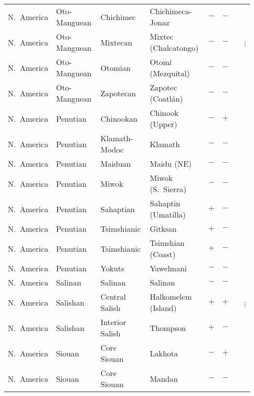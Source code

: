 \begin{landscape}
\begin{longtable}{l>{\raggedright\arraybackslash}p{2.2cm}>{\raggedright}p{2.5cm}>{\raggedright\arraybackslash}p{2.5cm}cc>{\raggedright\arraybackslash}p{3.4cm}>{\raggedright\arraybackslash}p{3.4cm}}
N.~America & Oto-Manguean & Chichimec & Chichimeca-Jonaz & $-$ & $-$ & \citealt{Gil2013} & \citealt[23--30]{Suarez1984}\\
N.~America & Oto-Manguean & Mixtecan & Mixtec (Chalcatongo) & $-$ & $-$ & \citealt{Gil2013} & \citealt{Corbett2013}; \citealt[81--85]{Macaulay1996}\\
N.~America & Oto-Manguean & Otomian & Otomí (Mezquital) & $-$ & $-$ & \citealt[passim]{Hess1968} & \citealt[passim]{Hess1968}\\
N.~America & Oto-Manguean & Zapotecan & Zapotec (Coatlán) & $-$ & $-$ & \citealt[passim]{BeamdeAzcona2004} & \citealt[passim]{BeamdeAzcona2004}\\
N.~America & Penutian & Chinookan & Chinook (Upper) & $-$ & $+$ & \citealt{Gil2013} & \citealt[72--75, 214]{Hymes1955}\\
N.~America & Penutian & Klamath-Modoc & Klamath & $-$ & $-$ & \citealt{Gil2013} & \citealt[448--451]{Mithun2001}\\
N.~America & Penutian & Maiduan & Maidu (NE) & $-$ & $-$ & \citealt{Gil2013} & \citealt[299]{Nichols1992}\\
N.~America & Penutian & Miwok & Miwok (S.~Sierra) & $-$ & $-$ & \citealt{Gil2013} & \citealt{Corbett2013}\\
N.~America & Penutian & Sahaptian & Sahaptin (Umatilla) & $+$ & $-$ & \citealt[299]{Nichols1992} & \citealt[299]{Nichols1992}\\
N.~America & Penutian & Tsimshianic & Gitksan & $+$ & $-$ & \citealt[299]{Nichols1992} & \citealt[passim]{Hunt1993}\\
N.~America & Penutian & Tsimshianic & Tsimshian (Coast) & $+$ & $-$ & \citealt{Gil2013} & \citealt{Corbett2013}\\
N.~America & Penutian & Yokuts & Yawelmani & $-$ & $-$ & \citealt{Gil2013} & \citealt[299]{Nichols1992}\\
N.~America & Salinan & Salinan & Salinan & $-$ & $-$ & \citealt{Gil2013} & \citealt[299]{Nichols1992}\\
N.~America & Salishan & Central Salish & Halkomelem (Island) & $+$ & $+$ & \citealt[254--266]{Gerdts2004} & \citealt[417--418]{Gerdts2013}; \citealt[176--177]{Gerdts2010}\\
N.~America & Salishan & Interior Salish & Thompson & $+$ & $-$ & \citealt{Gil2013} & \citealt{Corbett2013}\\
N.~America & Siouan & Core Siouan & Lakhota & $-$ & $+$ & \citealt{Gil2013} & \citealt[36--37]{Valin1977}\\
N.~America & Siouan & Core Siouan & Mandan & $-$ & $-$ & \citealt{Gil2013} & \citealt[passim]{Kennard1936}\\

\end{longtable}
\end{landscape}
